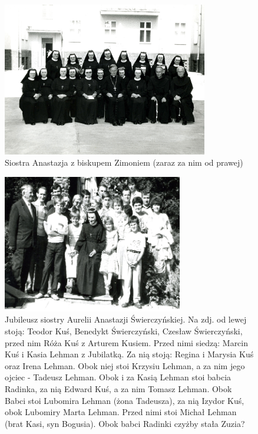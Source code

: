 \begin{figure}[!h]
\begin{center}
\includegraphics[width=0.8\textwidth]{photo/anastazja_swierczynska_3.jpg}
\caption[Siostra Anastazja z biskupem Zimoniem]{Siostra Anastazja z biskupem Zimoniem (zaraz za nim od prawej)}
\label{rys:anastazja_swierczynska_3}
\end{center}
\end{figure}

\begin{figure}[!b]
\begin{center}
\includegraphics[width=0.7\textwidth]{photo/anastazja_swierczynska_4.jpg}
\caption[Jubileusz siostry Aurelii Anastazji Świerczyńskiej]{Jubileusz siostry Aurelii Anastazji Świerczyńskiej. Na zdj. od lewej stoją: Teodor Kuś, Benedykt Świerczyński, Czesław Świerczyński, przed nim Róża Kuś z Arturem Kusiem. Przed nimi siedzą: Marcin Kuś i Kasia Lehman z Jubilatką. Za nią stoją: Regina i Marysia Kuś oraz Irena Lehman. Obok niej stoi Krzysiu Lehman, a za nim jego ojciec - Tadeusz Lehman. Obok i za Kasią Lehman stoi babcia Radinka, za nią Edward Kuś, a za nim Tomasz Lehman. Obok Babci stoi Lubomira Lehman (żona Tadeusza), za nią Izydor Kuś, obok Lubomiry Marta Lehman. Przed nimi stoi Michał Lehman (brat Kasi, syn Bogusia). Obok babci Radinki czyżby stała Zuzia?}
\label{rys:anastazja_swierczynska_4}
\end{center}
\end{figure}

